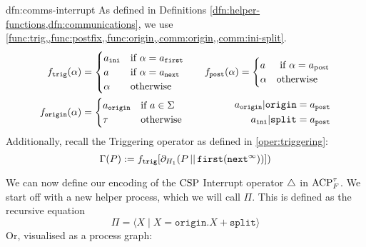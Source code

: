 \documentclass[../hons_project.tex]{subfiles}
\begin{document}
\begin{dfn}{dfn:comms-interrupt}{}
	As defined in Definitions \cref{dfn:helper-functions,dfn:communications}, we use \cref{func:trig,,func:postfix,,func:origin,,comm:origin,,comm:ini-split}.
	\begin{align*}
		f_{\mathtt{trig}}(\alpha) & = \begin{cases}
			                              a_{\mathtt{ini}} & \text{if } \alpha = a_{\mathtt{first}} \\
			                              a                & \text{if } \alpha = a_{\mathtt{next}}  \\
			                              \alpha           & \text{otherwise}
		                              \end{cases} \quad
		                          & f_{\mathtt{post}}(\alpha) = \begin{cases}
			                                                                    a      & \text{ if } \alpha = a_{\mathrm{post}} \\
			                                                                    \alpha & \text{otherwise}
		                                                                    \end{cases}\\
		\fdef{origin}(\alpha)     & = \begin{cases}
			                              a_{\mathtt{origin}} & \text{if } a\in\Sigma \\
			                              \tau                & \text{otherwise}
		                              \end{cases}  & \begin{split}
									  a_{\mathtt{origin}} | \mathtt{origin}  = a_{\mathtt{post}}&\\
									  a_{\mathtt{ini}} | \mathtt{split} = a_{\mathtt{post}}&
		                            \end{split}
	\end{align*}
	Additionally, recall the Triggering operator as defined in \ref{oper:triggering}:
	\[\Gamma(P) := f_{\mathtt{trig}}[\partial_{H_{1}}(P \merge \mathtt{first}(\mathtt{next}^{\infty}))])\]
\end{dfn}

We can now define our encoding of the $\csp$ Interrupt operator $\interrupt$ in $\acptf$. We start off with a new helper process, which we will call $\Pi$. This is defined as the recursive equation
\[\Pi = \langle X \mid X = \mathtt{origin}.X + \mathtt{split} \rangle\]
Or, visualised as a process graph:
\[\]
\end{document}
